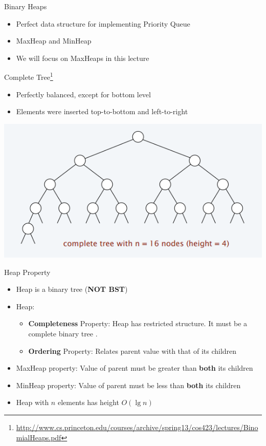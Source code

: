 \documentclass{beamer}
\begin{document}
\begin{frame}{Binary Heaps}
    \begin{itemize}
        \item Perfect data structure for implementing Priority Queue
        \item MaxHeap and MinHeap
        \item We will focus on MaxHeaps in this lecture
    \end{itemize}
\end{frame}


\begin{frame}{Complete Tree\footnote{\url{http://www.cs.princeton.edu/courses/archive/spring13/cos423/lectures/BinomialHeaps.pdf}}}
    \begin{itemize}
        \item Perfectly balanced, except for bottom level
        \item Elements were inserted top-to-bottom and left-to-right
    \end{itemize}
    \begin{center}
        \includegraphics[scale=0.4]{completeTreeEg.png}
    \end{center}
\end{frame}

\begin{frame}{Heap Property}
    \begin{itemize}
        \item Heap is a binary tree ({\bf NOT BST})
        \item Heap:
        \begin{itemize}
            \item {\bf Completeness} Property: Heap has restricted structure. It must be a complete binary tree . 
            \item {\bf Ordering} Property: Relates parent value with that of its children
        \end{itemize}
        \item MaxHeap property: Value of parent must be greater than {\bf both} its children
        \item MinHeap property: Value of parent must be less than {\bf both} its children
        \item Heap with $n$ elements has height $O(\lg n)$
    \end{itemize}
\end{frame}
\end{document}
